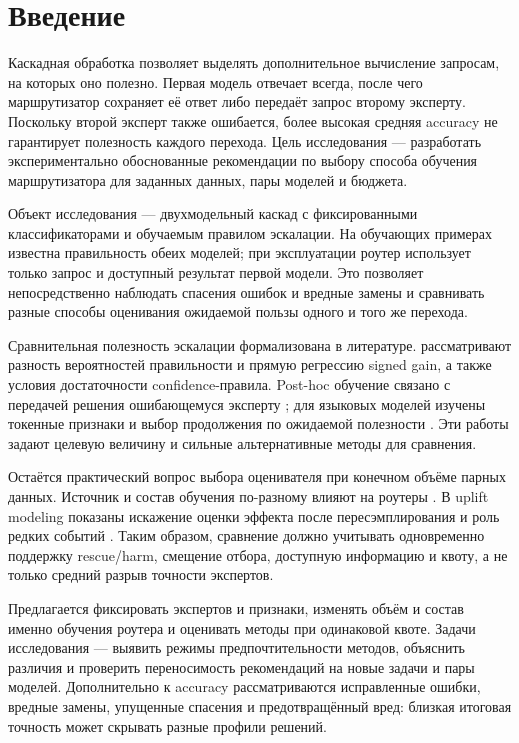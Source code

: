 \section{Введение}
Каскадная обработка позволяет выделять дополнительное вычисление запросам,
на которых оно полезно. Первая модель отвечает всегда, после чего
маршрутизатор сохраняет её ответ либо передаёт запрос второму эксперту.
Поскольку второй эксперт также ошибается, более высокая средняя accuracy
не гарантирует полезность каждого перехода. Цель исследования ---
разработать экспериментально обоснованные рекомендации по выбору способа
обучения маршрутизатора для заданных данных, пары моделей и бюджета.

Объект исследования --- двухмодельный каскад с фиксированными
классификаторами и обучаемым правилом эскалации. На обучающих примерах
известна правильность обеих моделей; при эксплуатации роутер использует
только запрос и доступный результат первой модели. Это позволяет
непосредственно наблюдать спасения ошибок и вредные замены и сравнивать
разные способы оценивания ожидаемой пользы одного и того же перехода.

Сравнительная полезность эскалации формализована в литературе.
\citet{jitkrittum2023confidence} рассматривают разность вероятностей
правильности и прямую регрессию signed gain, а также условия достаточности
confidence-правила. Post-hoc обучение связано с передачей решения
ошибающемуся эксперту \citep{narasimhan2022posthoc}; для языковых моделей
изучены токенные признаки \citep{gupta2024cascades} и выбор продолжения
по ожидаемой полезности \citep{aggarwal2024automix}. Эти работы задают
целевую величину и сильные альтернативные методы для сравнения.

Остаётся практический вопрос выбора оценивателя при конечном объёме
парных данных. Источник и состав обучения по-разному влияют на роутеры
\citep{ong2025routellm,niu2026routing}. В uplift modeling показаны
искажение оценки эффекта после пересэмплирования и роль редких событий
\citep{nyberg2023exploring}. Таким образом, сравнение должно учитывать
одновременно поддержку rescue/harm, смещение отбора, доступную информацию
и квоту, а не только средний разрыв точности экспертов.

Предлагается фиксировать экспертов и признаки, изменять объём и состав
именно обучения роутера и оценивать методы при одинаковой квоте.
Задачи исследования --- выявить режимы предпочтительности методов,
объяснить различия и проверить переносимость рекомендаций на новые
задачи и пары моделей. Дополнительно к accuracy рассматриваются
исправленные ошибки, вредные замены, упущенные спасения и предотвращённый
вред: близкая итоговая точность может скрывать разные профили решений.

